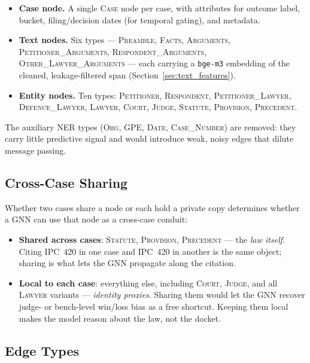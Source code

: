 \begin{sloppypar}
\begin{itemize}
  \item \textbf{Case node.} A single \textsc{Case} node per case, with attributes for outcome label, bucket, filing/decision dates (for temporal gating), and metadata.
  \item \textbf{Text nodes.} Six types --- \textsc{Preamble}, \textsc{Facts}, \textsc{Arguments}, \textsc{Petitioner\_Arguments}, \textsc{Respondent\_Arguments}, \textsc{Other\_Lawyer\_Arguments} --- each carrying a \texttt{bge-m3} embedding of the cleaned, leakage-filtered span (Section~\ref{sec:text_features}).
  \item \textbf{Entity nodes.} Ten types: \textsc{Petitioner}, \textsc{Respondent}, \textsc{Petitioner\_Lawyer}, \textsc{Defence\_Lawyer}, \textsc{Lawyer}, \textsc{Court}, \textsc{Judge}, \textsc{Statute}, \textsc{Provision}, \textsc{Precedent}.
\end{itemize}
\end{sloppypar}

The auxiliary NER types (\textsc{Org}, \textsc{GPE}, \textsc{Date}, \textsc{Case\_Number}) are removed: they carry little predictive signal and would introduce weak, noisy edges that dilute message passing.

\subsection{Cross-Case Sharing}

Whether two cases share a node or each hold a private copy determines whether a GNN can use that node as a cross-case conduit:

\begin{itemize}
  \item \textbf{Shared across cases}: \textsc{Statute}, \textsc{Provision}, \textsc{Precedent} --- the \emph{law itself}. Citing IPC~420 in one case and IPC~420 in another is the same object; sharing is what lets the GNN propagate along the citation.
  \item \textbf{Local to each case}: everything else, including \textsc{Court}, \textsc{Judge}, and all \textsc{Lawyer} variants --- \emph{identity proxies}. Sharing them would let the GNN recover judge- or bench-level win/loss bias as a free shortcut. Keeping them local makes the model reason about the law, not the docket.
\end{itemize}

\subsection{Edge Types}

